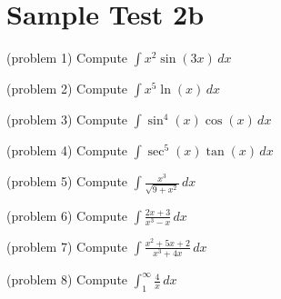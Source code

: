\documentclass{ximera}
\begin{document}
\section{Sample Test 2b}





\begin{problem}(problem 1)
Compute $\displaystyle \int x^2\sin(3x) \, dx$

\end{problem}


\begin{problem}(problem 2)
Compute $\displaystyle \int x^5 \ln(x) \, dx$

\end{problem}

\begin{problem}(problem 3)
Compute $\displaystyle \int \sin^4(x) \cos(x) \, dx$

\end{problem}

\begin{problem}(problem 4)
Compute $\displaystyle \int \sec^5(x) \tan(x)  \, dx$

\end{problem}

\begin{problem}(problem 5)
Compute $\displaystyle \int \frac{x^3}{ \sqrt{9+x^2}} \, dx$

\end{problem}

\begin{problem}(problem 6)
Compute $\displaystyle \int \frac{2x+3}{x^3-x} \, dx$

\end{problem}

\begin{problem}(problem 7)
Compute $\displaystyle \int \frac{x^2 + 5x + 2}{x^3 + 4x} \, dx$

\end{problem}

\begin{problem}(problem 8)
Compute $\displaystyle \int_1^\infty \frac{4}{x} \, dx$

\end{problem}
\end{document}
